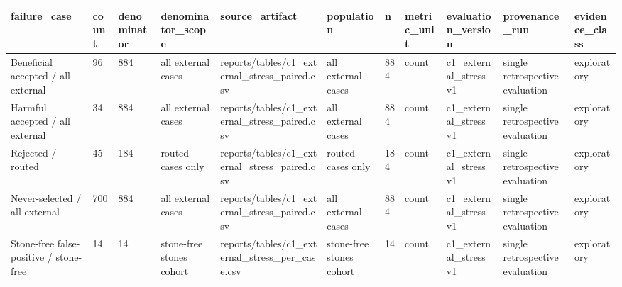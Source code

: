 \begin{tabular}{lllllllllll}
\hline
failure\_case & count & denominator & denominator\_scope & source\_artifact & population & n & metric\_unit & evaluation\_version & provenance\_run & evidence\_class \\
\hline
Beneficial accepted / all external & 96 & 884 & all external cases & reports/tables/c1\_external\_stress\_paired.csv & all external cases & 884 & count & c1\_external\_stress v1 & single retrospective evaluation & exploratory \\
Harmful accepted / all external & 34 & 884 & all external cases & reports/tables/c1\_external\_stress\_paired.csv & all external cases & 884 & count & c1\_external\_stress v1 & single retrospective evaluation & exploratory \\
Rejected / routed & 45 & 184 & routed cases only & reports/tables/c1\_external\_stress\_paired.csv & routed cases only & 184 & count & c1\_external\_stress v1 & single retrospective evaluation & exploratory \\
Never-selected / all external & 700 & 884 & all external cases & reports/tables/c1\_external\_stress\_paired.csv & all external cases & 884 & count & c1\_external\_stress v1 & single retrospective evaluation & exploratory \\
Stone-free false-positive / stone-free & 14 & 14 & stone-free stones cohort & reports/tables/c1\_external\_stress\_per\_case.csv & stone-free stones cohort & 14 & count & c1\_external\_stress v1 & single retrospective evaluation & exploratory \\
\hline
\end{tabular}
